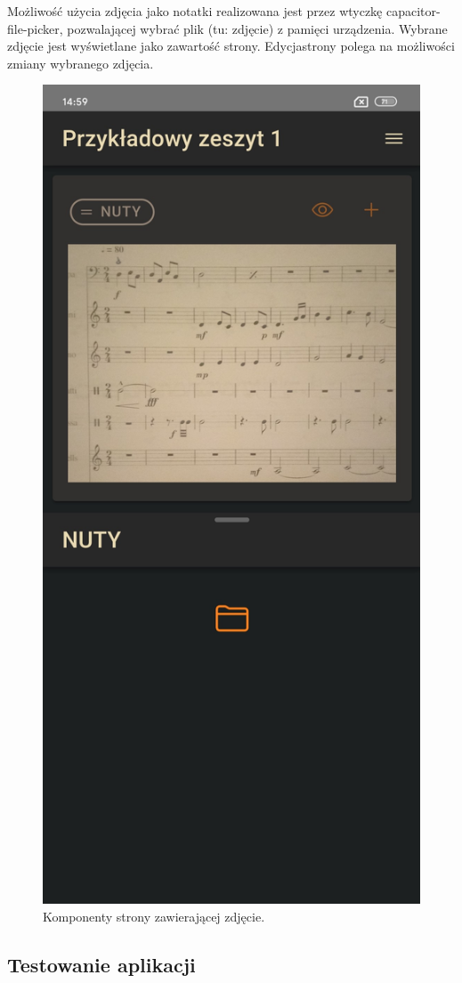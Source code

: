 Możliwość użycia zdjęcia jako notatki realizowana jest przez wtyczkę capacitor-file-picker,
pozwalającej wybrać plik (tu: zdjęcie) z pamięci urządzenia. Wybrane zdjęcie jest wyświetlane jako zawartość strony.
Edycjastrony polega na możliwości zmiany wybranego zdjęcia.

\begin{figure}[H]
	\begin{center}
		\includegraphics[scale=0.2]{media/PhotoPage.jpg}
	\end{center}
	\caption{Komponenty strony zawierającej zdjęcie.}
	\label{rys:photo-page}
\end{figure}

\subsection{Testowanie aplikacji}

